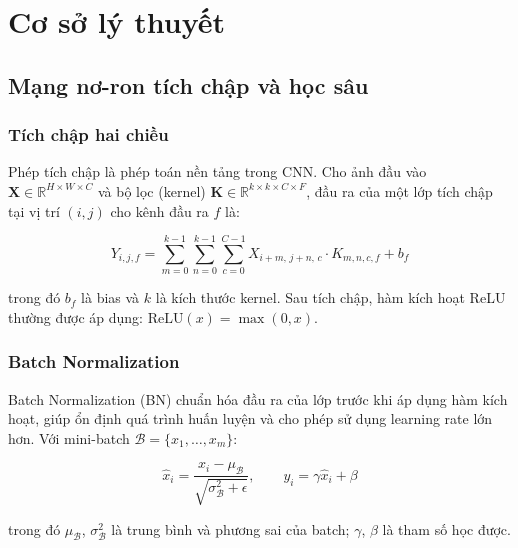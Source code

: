 
\chapter{Cơ sở lý thuyết}

\label{Chapter2}


\section{Mạng nơ-ron tích chập và học sâu}

\subsection{Tích chập hai chiều}

Phép tích chập là phép toán nền tảng trong CNN. Cho ảnh đầu vào $\mathbf{X} \in \mathbb{R}^{H \times W \times C}$ và bộ lọc (kernel) $\mathbf{K} \in \mathbb{R}^{k \times k \times C \times F}$, đầu ra của một lớp tích chập tại vị trí $(i, j)$ cho kênh đầu ra $f$ là:

\begin{equation}
    Y_{i,j,f} = \sum_{m=0}^{k-1} \sum_{n=0}^{k-1} \sum_{c=0}^{C-1} X_{i+m,\, j+n,\, c} \cdot K_{m,n,c,f} + b_f
    \label{eq:conv2d}
\end{equation}

trong đó $b_f$ là bias và $k$ là kích thước kernel. Sau tích chập, hàm kích hoạt ReLU thường được áp dụng: $\text{ReLU}(x) = \max(0, x)$.

\subsection{Batch Normalization}

Batch Normalization (BN) \cite{Goodfellow2016} chuẩn hóa đầu ra của lớp trước khi áp dụng hàm kích hoạt, giúp ổn định quá trình huấn luyện và cho phép sử dụng learning rate lớn hơn. Với mini-batch $\mathcal{B} = \{x_1, \ldots, x_m\}$:

\begin{equation}
    \hat{x}_i = \frac{x_i - \mu_{\mathcal{B}}}{\sqrt{\sigma_{\mathcal{B}}^2 + \epsilon}}, \qquad
    y_i = \gamma \hat{x}_i + \beta
    \label{eq:batchnorm}
\end{equation}

trong đó $\mu_{\mathcal{B}}$, $\sigma_{\mathcal{B}}^2$ là trung bình và phương sai của batch; $\gamma$, $\beta$ là tham số học được.

